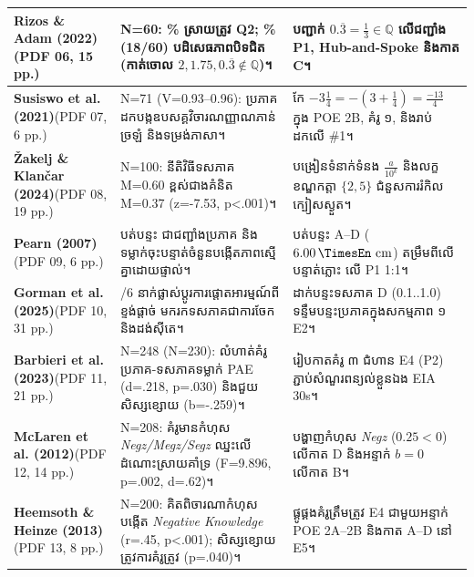\documentclass[a4paper,12pt]{article}
\newcommand{\en}[1]{{\TimesEn #1}}
\newcommand{\enit}[1]{{\TimesEn\textit{#1}}}
\newcommand{\unit}[1]{\,\text{\en{#1}}}
\begin{document}
\begin{longtable}{|L{3.55cm}|L{6.65cm}|L{6.75cm}|}
\hline
\en{\textbf{Rizos \& Adam (2022)}}\newline (\en{PDF 06, 15 pp.}) & \en{N=60}: \en{26.67\%} ស្រាយត្រូវ \en{Q2}; \en{30\% (18/60)} បដិសេធភាពបិទជិត (កាត់ចោល $2, 1.75, 0.\overline{3}\notin\mathbb{Q}$)។ & បញ្ជាក់ $0.\overline{3}=\frac{1}{3}\in\mathbb{Q}$ លើជញ្ជាំង \en{P1}, \en{Hub-and-Spoke} និងកាត \en{C}។ \\
\hline
\en{\textbf{Susiswo et al. (2021)}}\newline (\en{PDF 07, 6 pp.}) & \en{N=71} (\en{V=0.93–0.96}): ប្រភាគដកបង្កឧបសគ្គវិចារណញ្ញាណភាន់ច្រឡំ និងទម្រង់ភាសា។ & កែ $-3\frac{1}{4}=-(3+\frac{1}{4})=\frac{-13}{4}$ ក្នុង \en{POE 2B}, គំរូ ១, និងរាប់ដកលើ \en{\#1}។ \\
\hline
\en{\textbf{Žakelj \& Klančar (2024)}}\newline (\en{PDF 08, 19 pp.}) & \en{N=100}: នីតិវិធីទសភាគ \en{M=0.60} ខ្ពស់ជាងគំនិត \en{M=0.37 (z=-7.53, p<.001)}។ & បង្រៀនទំនាក់ទំនង $\frac{a}{10^k}$ និងលក្ខខណ្ឌកត្តា $\{2,5\}$ ជំនួសការរំកិលក្បៀសស្ងួត។ \\
\hline
\en{\textbf{Pearn (2007)}}\newline (\en{PDF 09, 6 pp.}) & បត់បន្ទះ \en{20cm} ជាជញ្ជាំងប្រភាគ និងទម្លាក់ចុះបន្ទាត់ចំនួនបង្កើតភាពស្មើគ្នាដោយផ្ទាល់។ & បត់បន្ទះ \en{A–D} ($6.00\unit{cm}$) តម្រឹមពីលើបន្ទាត់ភ្លោះ \en{[-1.5, +1.5]} លើ \en{P1 1:1}។ \\
\hline
\en{\textbf{Gorman et al. (2025)}}\newline (\en{PDF 10, 31 pp.}) & \en{5/6} នាក់ផ្លាស់ប្ដូរការផ្ដោតអារម្មណ៍ពីខ្ទង់ផ្ដាច់ មករកទសភាគជាការចែកនិងដង់ស៊ីតេ។ & ដាក់បន្ទះទសភាគ \en{D (0.1..1.0)} ទន្ទឹមបន្ទះប្រភាគក្នុងសកម្មភាព ១ \en{E2}។ \\
\hline
\en{\textbf{Barbieri et al. (2023)}}\newline (\en{PDF 11, 21 pp.}) & \en{N=248 (N=230)}: លំហាត់គំរូប្រភាគ-ទសភាគទម្លាក់ \en{PAE (d=.218, p=.030)} និងជួយសិស្សខ្សោយ (\en{b=-.259})។ & រៀបកាតគំរូ ៣ ជំហាន \en{E4 (P2)} ភ្ជាប់សំណួរពន្យល់ខ្លួនឯង \en{EIA 30s}។ \\
\hline
\en{\textbf{McLaren et al. (2012)}}\newline (\en{PDF 12, 14 pp.}) & \en{N=208}: គំរូមានកំហុស \enit{Negz/Megz/Segz} ឈ្នះលើដំណោះស្រាយគាំទ្រ (\en{F=9.896, p=.002, d=.62})។ & បង្ហាញកំហុស \enit{Negz} ($0.25<0$) លើកាត \en{D} និងអន្ទាក់ $b=0$ លើកាត \en{B}។ \\
\hline
\en{\textbf{Heemsoth \& Heinze (2013)}}\newline (\en{PDF 13, 8 pp.}) & \en{N=200}: គិតពិចារណាកំហុសបង្កើត \enit{Negative Knowledge} (\en{r=.45, p<.001}); សិស្សខ្សោយត្រូវការគំរូត្រូវ (\en{p=.040})។ & ផ្គូផ្គងគំរូត្រឹមត្រូវ \en{E4} ជាមួយអន្ទាក់ \en{POE 2A–2B} និងកាត \en{A–D} នៅ \en{E5}។ \\

\end{longtable}
\end{document}

